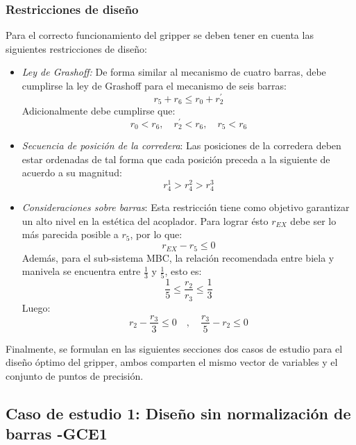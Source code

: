 \subsubsection{Restricciones de diseño}\label{sec:Restricciones de diseño MEC_gripper}
Para el correcto funcionamiento del gripper se deben tener en cuenta las siguientes restricciones de diseño: 
\begin{itemize}
\item \textit{Ley de Grashoff:} De forma similar al mecanismo de cuatro barras, debe cumplirse la ley de Grashoff para el mecanismo de seis barras:
\begin{equation}
r_5+r_6 \leq r_0+r^{\prime}_2
\end{equation}
Adicionalmente debe cumplirse que:
\begin{equation}
r_0<r_6, \quad r^{\prime}_2<r_6 ,\quad r_5 < r_6
\end{equation}

\item \textit{Secuencia de posición de la corredera}: Las  posiciones de la corredera deben estar ordenadas de tal forma que cada posición preceda a la siguiente de acuerdo a su magnitud:
\begin{equation}
r^1_4 > r^2_4 > r^3_4
\end{equation}

\item \textit{Consideraciones sobre barras}: Esta restricción tiene como objetivo garantizar un alto nivel en la estética del acoplador. Para lograr ésto $r_{EX}$ debe ser lo más parecida posible a $r_5$, por lo que: 
\begin{equation}
 r_{EX} - r_5 \leq 0
\end{equation}
Además, para el sub-sistema MBC, la relación recomendada entre biela y manivela se encuentra entre $\frac{1}{3}$ y $\frac{1}{5}$, esto es:
\begin{equation}
\frac{1}{5} \leq \frac{r_2}{r_3}\leq \frac{1}{3}
\end{equation}
Luego:
\begin{equation}
r_2 -\frac{r_3}{3} \leq 0 \quad , \quad \frac{r_3}{5} -r_2 \leq 0
\end{equation}
\end{itemize}

Finalmente, se formulan en las siguientes secciones dos casos de estudio para  el diseño óptimo del gripper, ambos comparten el mismo vector de variables y el conjunto de puntos de precisión.
\subsection{Caso de estudio 1: Diseño sin normalización de barras -GCE1}

